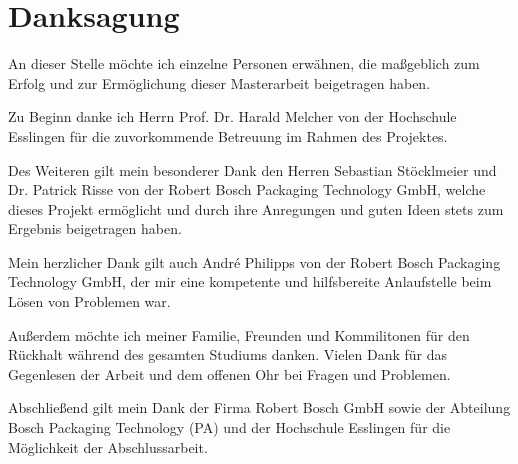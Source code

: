 \chapter*{Danksagung}
\thispagestyle{empty}

An dieser Stelle möchte ich einzelne Personen erwähnen, die maßgeblich zum Erfolg und zur Ermöglichung dieser
Masterarbeit beigetragen haben.

Zu Beginn danke ich Herrn Prof. Dr. Harald Melcher von der Hochschule Esslingen für die zuvorkommende Betreuung im Rahmen
des Projektes.

Des Weiteren gilt mein besonderer Dank den Herren Sebastian Stöcklmeier und Dr. Patrick Risse von der Robert Bosch
Packaging Technology GmbH, welche dieses Projekt ermöglicht und durch ihre Anregungen und guten Ideen stets zum Ergebnis
beigetragen haben.

Mein herzlicher Dank gilt auch André Philipps von der Robert Bosch Packaging Technology GmbH, der mir eine kompetente und
hilfsbereite Anlaufstelle beim Lösen von Problemen war.

Außerdem möchte ich meiner Familie, Freunden und Kommilitonen für den Rückhalt während des gesamten Studiums danken.
Vielen Dank für das Gegenlesen der Arbeit und dem offenen Ohr bei Fragen und Problemen.

Abschließend gilt mein Dank der Firma Robert Bosch GmbH sowie der Abteilung Bosch Packaging Technology (PA) und der
Hochschule Esslingen für die Möglichkeit der Abschlussarbeit.